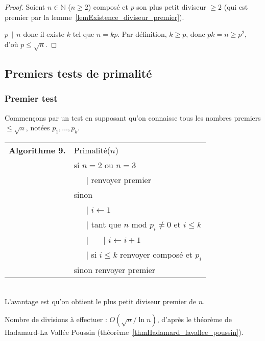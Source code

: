 \documentclass[12pt]{report}
\begin{document}
\begin{proof}
Soient $n \in \mathbb{N}$ ($n \geq 2$) composé et $p$ son plus petit diviseur $\geq 2$ (qui est premier par la lemme~\ref{lemExistence_diviseur_premier}). \par 
$p \, \mid \,  n$ donc il existe $k$ tel que $n=kp$. Par définition, $k \geq p$, donc $pk=n \geq p^2$, d'où $p \leq \sqrt{n}$.  
\end{proof}



\subsection*{Premiers tests de primalité}

\subsubsection*{Premier test}

Commençons par un test en supposant qu'on connaisse tous les nombres premiers $\leq \sqrt{n}$, notées $p_1, \ldots , p_k $. \\


\begin{tabular}{ll}
\textbf{Algorithme 9.} & Primalité($n$)\\
           & si $n=2$ ou $n=3$ \\
           & \ \ \ {\rm | } renvoyer premier  \\
           & sinon \\
           & \ \ \ {\rm |} $i \leftarrow 1$ \\
           & \ \ \ {\rm | } tant que $ n \text{ mod } p_i \neq 0 $ et $i \leq k$  \\
           & \ \ \ {\rm | } \ \ \ {\rm |} $ i \leftarrow i+1$\\ 
           & \ \ \ {\rm | } si $i \leq k$ renvoyer composé et $p_i$  \\    
           & sinon renvoyer premier 
\end{tabular}\\

L'avantage est qu'on obtient le plus petit diviseur premier de $n$.\par 

Nombre de divisions à effectuer : $O (\sqrt{n}/ \ln n)$, d'après le théorème de Hadamard-La Vallée Poussin (théorème~\ref{thmHadamard_lavallee_poussin}).
\end{document}
